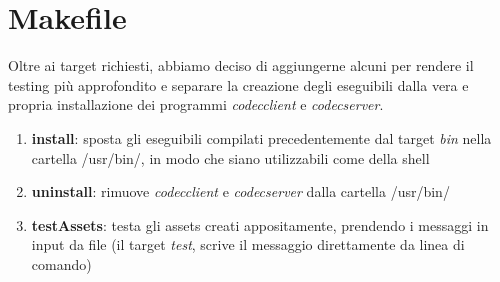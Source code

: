 \documentclass[a4paper,9pt]{article}
\begin{document}
\section{Makefile}
Oltre ai target richiesti, abbiamo deciso di aggiungerne alcuni per rendere il testing più approfondito e separare la creazione degli eseguibili dalla vera e propria installazione dei programmi \emph{codecclient} e \emph{codecserver}.
\begin{enumerate}
\item \textbf{install}: sposta gli eseguibili compilati precedentemente dal target \emph{bin} nella cartella /usr/bin/, in modo che siano utilizzabili come della shell
\item \textbf{uninstall}: rimuove \emph{codecclient} e \emph{codecserver} dalla cartella /usr/bin/
\item \textbf{testAssets}: testa gli assets creati appositamente, prendendo i messaggi in input da file (il target \emph{test}, scrive il messaggio direttamente da linea di comando)
\end{enumerate} 
\end{document}
